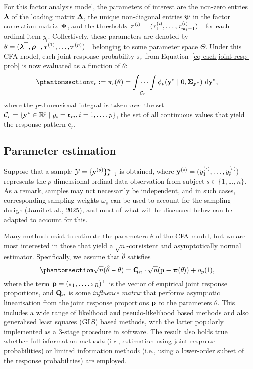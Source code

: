 \documentclass[
  letterpaper,
  DIV=11,
  numbers=noendperiod]{scrartcl}
\begin{document}
For this factor analysis model, the parameters of interest are the
non-zero entries \({\boldsymbol\lambda}\) of the loading matrix \({\boldsymbol\Lambda}\), the
unique non-diagonal entries \({\boldsymbol\psi}\) in the factor correlation matrix
\({\boldsymbol\Psi}\), and the thresholds
\({\boldsymbol\tau}^{(i)} = (\tau_1^{(i)},\dots,\tau_{m_i-1}^{(i)})^\top\) for each
ordinal item \(y_i\). Collectively, these parameters are denoted by
\(\theta = ({\boldsymbol\lambda}^\top,{\boldsymbol\rho}^\top,{\boldsymbol\tau}^{(1)},\dots,{\boldsymbol\tau}^{(p)})^\top\)
belonging to some parameter space \(\Theta\). Under this CFA model, each
joint response probability \(\pi_r\) from
Equation~\ref{eq-each-joint-resp-prob} is now evaluated as a function of
\(\theta\):
\begin{equation}\phantomsection\label{eq-joint-resp-prob-integral}{
\pi_r := \pi_r(\theta) = \idotsint \limits_{\mathcal C_r} \phi_p(\by^* \mid \bzero,\bSigma_{\by^*}) \, \dint\by^*,
}\end{equation} where the \(p\)-dimensional integral is taken over the
set
\(\mathcal C_r = \{ {\mathbf y}^* \in \mathbb{R}^p \mid y_i = \mathbf c_{ri}, i=1,\dots,p\}\),
the set of all continuous values that yield the response pattern
\(\mathbf c_r\).

\subsection{Parameter estimation}\label{parameter-estimation}

Suppose that a sample \(\mathcal Y = \{{\mathbf y}^{(s)}\}_{s=1}^n\) is
obtained, where \({\mathbf y}^{(s)} = (y_1^{(s)},\ldots,y_p^{(s)})^\top\)
represents the \(p\)-dimensional ordinal-data observation from subject
\(s\in\{1,\dots,n\}\). As a remark, samples may not necessarily be
independent, and in such cases, corresponding sampling weights
\(\omega_s\) can be used to account for the sampling design (Jamil et
al., 2025), and most of what will be discussed below can be adapted to
account for this.

Many methods exist to estimate the parameters \(\theta\) of the CFA
model, but we are most interested in those that yield a
\(\sqrt{n}\)-consistent and asymptotically normal estimator.
Specifically, we assume that \(\hat\theta\) satisfies
\begin{equation}\phantomsection\label{eq-theta-consistent}{
\sqrt{n}(\hat\theta - \theta) = \bQ_n \cdot \sqrt{n}(\bp - \bpi(\theta)) + o_p(1),
}\end{equation} where the term \({\mathbf p} = (\pi_1,\ldots,\pi_R)^\top\) is
the vector of empirical joint response proportions, and \({\mathbf Q}_n\) is
some \emph{influence matrix} that performs asymptotic linearisation from
the joint response proportions \({\mathbf p}\) to the parameters \(\theta\).
This includes a wide range of likelihood and pseudo-likelihood based
methods and also generalised least squares (GLS) based methods, with the
latter popularly implemented as a 3-stage procedure in software. The
result also holds true whether full information methods (i.e.,
estimation using joint response probabilities) or limited information
methods (i.e., using a lower-order subset of the response probabilities)
are employed.
\end{document}
